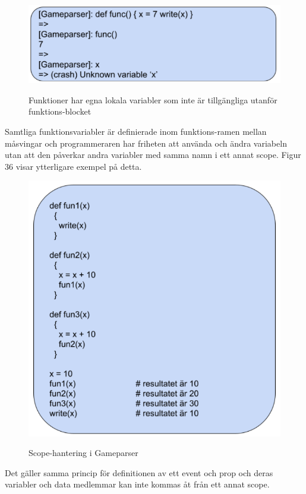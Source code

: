 \documentclass{Dokumentmall}
\begin{document}
\begin{figure}[h!]
  \centering
  \includegraphics[scale = 0.65]{Images/Figur35.png}
  \label{}
  \caption{Funktioner har egna lokala variabler som inte är tillgängliga utanför funktions-blocket}
\end{figure}

Samtliga funktionsvariabler är definierade inom funktions-ramen mellan måsvingar och programmeraren har friheten att använda och ändra variabeln utan att den påverkar andra variabler med samma namn i ett annat scope. Figur 36 visar ytterligare exempel på detta.

\begin{figure}[h!]
  \centering
  \includegraphics[scale = 0.65]{Images/Figur36.png}
  \label{}
  \caption{Scope-hantering i Gameparser}
\end{figure}

\newpage
Det gäller samma princip för definitionen av ett event och prop och deras variabler och data medlemmar kan inte kommas åt från ett annat scope.
\end{document}
